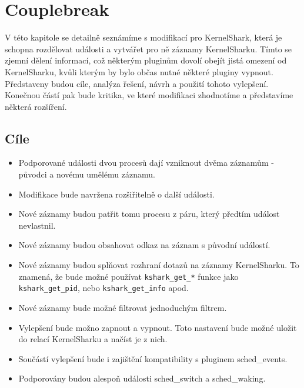 \chapter{Couplebreak}
V této kapitole se detailně seznámíme s modifikací pro KernelShark, která je schopna rozdělovat události a vytvářet pro ně záznamy KernelSharku. Tímto se zjemní dělení informací, což některým pluginům dovolí obejít jistá omezení od KernelSharku, kvůli kterým by bylo občas nutné některé pluginy vypnout. Představeny budou cíle, analýza řešení, návrh a použití tohoto vylepšení. Konečnou částí pak bude kritika, ve které modifikaci zhodnotíme a představíme některá rozšíření.

\section{Cíle}
\begin{itemize}
    \item Podporované události dvou procesů dají vzniknout dvěma záznamům - původci a novému umělému záznamu.
    \item Modifikace bude navržena rozšiřitelně o další události.
    \item Nové záznamy budou patřit tomu procesu z páru, který předtím událost nevlastnil.
    \item Nové záznamy budou obsahovat odkaz na záznam s původní událostí.
    \item Nové záznamy budou splňovat rozhraní dotazů na záznamy KernelSharku. To znamená, že bude možné používat \texttt{kshark\_get\_*} funkce jako \texttt{kshark\_get\_pid}, nebo \texttt{kshark\_get\_info} apod.
    \item Nové záznamy bude možné filtrovat jednoduchým filtrem.
    \item Vylepšení bude možno zapnout a vypnout. Toto nastavení bude možné uložit do relací KernelSharku a načíst je z nich.
    \item Součástí vylepšení bude i zajištění kompatibility s pluginem sched\_events.
    \item Podporovány budou alespoň události sched\_switch a sched\_waking.
\end{itemize}

